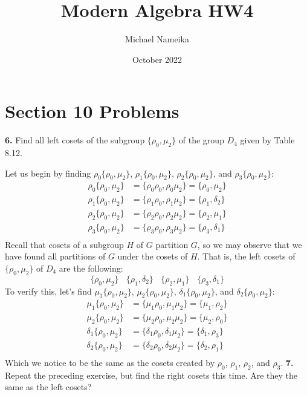 \documentclass{article}
\title{Modern Algebra HW4}
\author{Michael Nameika}
\date{October 2022}
\begin{document}
\maketitle

\section*{Section 10 Problems}

\textbf{6.} Find all left cosets of the subgroup $\{\rho_0, \mu_2\}$ of the group $D_4$ given by Table 8.12. 
\newline

Let us begin by finding $\rho_0\{\rho_0, \mu_2\}$, $\rho_1\{\rho_0, \mu_2\}$, $\rho_2\{\rho_0, \mu_2\}$, and $\rho_3\{\rho_0, \mu_2\}$:
\begin{align*}
    \rho_0\{\rho_0, \mu_2\} &= \{\rho_0\rho_0, \rho_0\mu_2\} = \{\rho_0, \mu_2\} \\ 
    \rho_1\{\rho_0, \mu_2\} &= \{\rho_1\rho_0, \rho_1\mu_2\} = \{\rho_1, \delta_2\} \\
    \rho_2\{\rho_0, \mu_2\} &= \{\rho_2\rho_0, \rho_2\mu_2\} = \{\rho_2, \mu_1\} \\
    \rho_3\{\rho_0, \mu_2\} &= \{\rho_3\rho_0, \rho_3\mu_2\} = \{\rho_3, \delta_1\} \\
\end{align*}
Recall that cosets of a subgroup $H$ of $G$ partition $G$, so we may observe that we have found all partitions of $G$ under the cosets of $H$. That is, the left cosets of $\{\rho_0, \mu_2\}$ of $D_4$ are the following:
\[\{\rho_0, \mu_2\} \:\:  \:\: \{\rho_1, \delta_2\} \:\:  \:\: \{\rho_2, \mu_1\} \:\:  \:\: \{\rho_3, \delta_1\}\]
To verify this, let's find 
$\mu_1\{\rho_0, \mu_2\}$, $\mu_2\{\rho_0, \mu_2\}$, $\delta_1\{\rho_0, \mu_2\}$, and $\delta_2\{\rho_0, \mu_2\}$:
\begin{align*}
    \mu_1\{\rho_0, \mu_2\} &= \{\mu_1\rho_0, \mu_1\mu_2\} = \{\mu_1, \rho_2\} \\
    \mu_2\{\rho_0, \mu_2\} &= \{\mu_2\rho_0, \mu_2\mu_2\} = \{\mu_2, \rho_0\} \\
    \delta_1\{\rho_0, \mu_2\} &= \{\delta_1\rho_0, \delta_1\mu_2\} = \{\delta_1, \rho_3\} \\
    \delta_2\{\rho_0, \mu_2\} &= \{\delta_2\rho_0, \delta_2\mu_2\} = \{\delta_2, \rho_1\} \\
\end{align*}
Which we notice to be the same as the cosets created by $\rho_0$, $\rho_1$, $\rho_2$, and $\rho_3$.
\newline\newline
\textbf{7.}  Repeat the preceding exercise, but find the right cosets this time. Are they the same as the left cosets?
\newline
\end{document}
